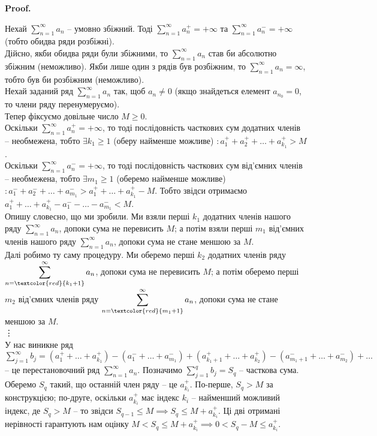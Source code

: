 \documentclass[a4paper, 10pt]{article}
\makeatletter
\def\qed{$\blacksquare$}
\theoremstyle{theoremdd}
\theoremstyle{theoremdd}
\theoremstyle{theoremdd}
\theoremstyle{theoremdd}
\theoremstyle{theoremdd}
\theoremstyle{theoremdd}
\theoremstyle{theoremdd}
\theoremstyle{theoremdd}
\theoremstyle{theoremdd}
\renewenvironment{proof}[1][Proof.\\]{\par
\pushQED{\hfill \qed}%
\normalfont \topsep6\p@\@plus6\p@\relax
\trivlist
\item\relax
{\bfseries
#1\@addpunct{.}}\hspace\labelsep\ignorespaces
}{%
\popQED\endtrivlist\@endpefalse
}
\makeatother
\begin{document}
\begin{proof}
Нехай $\displaystyle\sum_{n=1}^\infty a_n$ -- умовно збіжний. Тоді $\displaystyle\sum_{n=1}^\infty a_n^+ = +\infty$ та $\displaystyle\sum_{n=1}^\infty a_n^- = +\infty$ (тобто обидва ряди розбіжні).\\
Дійсно, якби обидва ряди були збіжними, то $\displaystyle\sum_{n=1}^\infty a_n$ став би абсолютно збіжним (неможливо). Якби лише один з рядів був розбіжним, то $\displaystyle\sum_{n=1}^\infty a_n = \infty$, тобто був би розбіжним (неможливо).\\
Нехай заданий ряд $\displaystyle\sum_{n=1}^\infty a_n$ так, щоб $a_n \neq 0$ (якщо знайдеться елемент $a_{n_0} = 0$, то члени ряду перенумеруємо).
\bigskip \\
Тепер фіксуємо довільне число $M \geq 0$.\\
Оскільки $\displaystyle\sum_{n=1}^\infty a_n^+ = +\infty$, то тоді послідовність часткових сум додатних членів -- необмежена, тобто $\exists k_1 \geq 1$ (оберу найменше можливе) $: a_1^+ + a_2^+ + \dots + a_{k_1}^+ > M$.\\
Оскільки $\displaystyle\sum_{n=1}^\infty a_n^- = +\infty$, то тоді послідовність часткових сум від'ємних членів -- необмежена, тобто $\exists m_1 \geq 1$ (оберемо найменше можливе) $: a_1^- + a_2^- + \dots + a_{m_1}^- > a_1^+ + \dots + a_{k_1}^+ - M$. Тобто звідси отримаємо $a_1^+ + \dots + a_{k_1}^+ - a_1^{-} - \dots - a_{m_1}^- < M$.\\
Опишу словесно, що ми зробили. Ми взяли перші $k_1$ додатних членів нашого ряду $\displaystyle\sum_{n=1}^\infty a_n$, допоки сума не перевисить $M$; а потім взяли перші $m_1$ від'ємних членів нашого ряду $\displaystyle\sum_{n=1}^\infty a_n$, допоки сума не стане меншою за $M$.\\
Далі робимо ту саму процедуру. Ми оберемо перші $k_2$ додатних членів ряду $\displaystyle\sum_{n=\textcolor{red}{k_1+1}}^\infty a_n$, допоки сума не перевисить $M$; а потім оберемо перші $m_2$ від'ємних членів ряду $\displaystyle\sum_{n=\textcolor{red}{m_1+1}}^\infty a_n$, допоки сума не стане меншою за $M$.\\
\vdots \\
У нас виникне ряд $\displaystyle\sum_{j=1}^\infty b_j = (a_1^+ + \dots + a_{k_1}^+) - (a_1^{-} + \dots + a_{m_1}^-) + (a_{k_1+1}^+ + \dots + a_{k_2}^+) - (a_{m_1+1}^{-} + \dots + a_{m_2}^-) + \dots$ -- це перестановочний ряд $\displaystyle\sum_{n=1}^\infty a_n$. Позначимо $\displaystyle\sum_{j=1}^q b_j = S_q$ -- часткова сума. \\
Оберемо $S_q$ такий, що останній член ряду -- це $a_{k_i}^+$. По-перше, $S_q > M$ за конструкцією; по-друге, оскільки $a_{k_i}^+$ має індекс $k_i$ -- найменший можливий індекс, де $S_q > M$ -- то звідси $S_{q-1} \leq M \implies S_q \leq M + a_{k_i}^+$. Ці дві отримані нерівності гарантують нам оцінку $M < S_q \leq M + a_{k_i}^+ \implies 0 < S_q - M \leq a_{k_i}^+$.\\

\end{proof}
\end{document}
